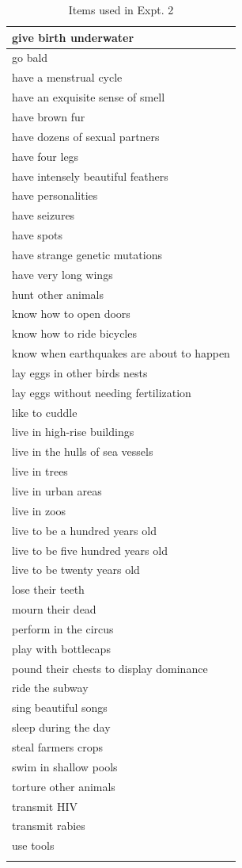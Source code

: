 \documentclass[floatsintext,doc]{apa6}
\begin{document}
\begin{longtable}{ |p{3in}|}
   \hline
give birth underwater \\ 
   \hline
go bald \\ 
   \hline
have a menstrual cycle \\ 
   \hline
have an exquisite sense of smell \\ 
   \hline
have brown fur \\ 
   \hline
have dozens of sexual partners \\ 
   \hline
have four legs \\ 
   \hline
have intensely beautiful feathers \\ 
   \hline
have personalities \\ 
   \hline
have seizures \\ 
   \hline
have spots \\ 
   \hline
have strange genetic mutations \\ 
   \hline
have very long wings \\ 
   \hline
hunt other animals \\ 
   \hline
know how to open doors \\ 
   \hline
know how to ride bicycles \\ 
   \hline
know when earthquakes are about to happen \\ 
   \hline
lay eggs in other birds nests \\ 
   \hline
lay eggs without needing fertilization \\ 
   \hline
like to cuddle \\ 
   \hline
live in high-rise buildings \\ 
   \hline
live in the hulls of sea vessels \\ 
   \hline
live in trees \\ 
   \hline
live in urban areas \\ 
   \hline
live in zoos \\ 
   \hline
live to be a hundred years old \\ 
   \hline
live to be five hundred years old \\ 
   \hline
live to be twenty years old \\ 
   \hline
lose their teeth \\ 
   \hline
mourn their dead \\ 
   \hline
perform in the circus \\ 
   \hline
play with bottlecaps \\ 
   \hline
pound their chests to display dominance \\ 
   \hline
ride the subway \\ 
   \hline
sing beautiful songs \\ 
   \hline
sleep during the day \\ 
   \hline
steal farmers crops \\ 
   \hline
swim in shallow pools \\ 
   \hline
torture other animals \\ 
   \hline
transmit HIV \\ 
   \hline
transmit rabies \\ 
   \hline
use tools \\ 
   \hline
\hline
\caption{Items used in Expt. 2} 
\end{longtable}
\endgroup

\newpage
\end{document}
